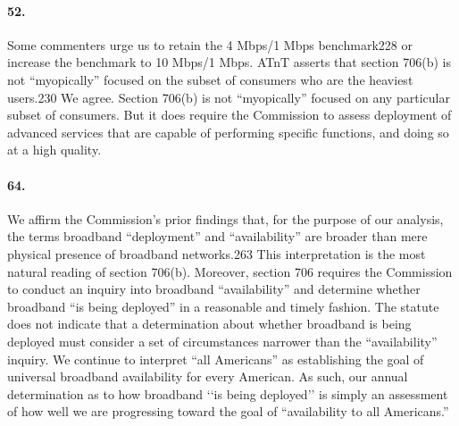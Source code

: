 \paragraph{52. }
Some commenters urge us to retain the 4 Mbps/1 Mbps benchmark228 or increase the
benchmark to 10 Mbps/1 Mbps. ATnT asserts that section 706(b) is not ``myopically'' focused on the subset of consumers who are the heaviest users.230 We agree. Section 706(b) is not ``myopically'' focused on any particular subset of consumers. But it does require the Commission to assess deployment of advanced services that are capable of performing specific functions, and doing so at a high quality.

\paragraph{64. }
We affirm the Commission’s prior findings that, for the purpose of our analysis, the terms broadband ``deployment'' and ``availability'' are broader than mere physical presence of broadband networks.263 This interpretation is the most natural reading of section 706(b). Moreover, section 706 requires the Commission to conduct an inquiry into broadband ``availability'' and determine whether broadband ``is being deployed'' in a reasonable and timely fashion. The statute does not indicate that a determination about whether broadband is being deployed must consider a set of circumstances narrower than the ``availability'' inquiry. We continue to interpret ``all Americans'' as establishing the goal of universal broadband availability for every American. As such, our annual determination as to how broadband ‘‘is being deployed’’ is simply an assessment of how well we are progressing toward the goal of ``availability to all Americans.''

